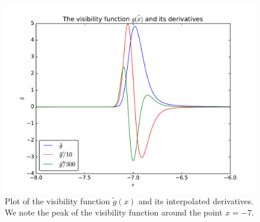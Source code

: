 \documentclass[12pt]{article}
\begin{document}
\begin{figure}[H]
\centering
\includegraphics[width=\linewidth]{Plots/VisibilityFunc.pdf}
\caption{Plot of the visibility function $\tilde{g}(x)$ and its interpolated derivatives. We note the peak of the visibility function around the point $x=-7$. }
\end{figure}

\newpage
\FloatBarrier
\end{document}
